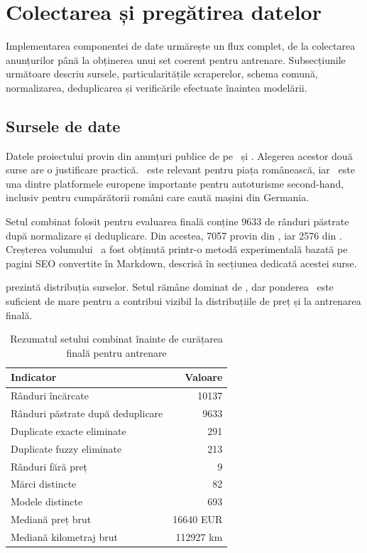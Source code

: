 \section{Colectarea și pregătirea datelor}
\label{sec:implementation-data}

Implementarea componentei de date urmărește un flux complet, de la colectarea anunțurilor până la obținerea unui set coerent pentru antrenare. Subsecțiunile următoare descriu sursele, particularitățile scraperelor, schema comună, normalizarea, deduplicarea și verificările efectuate înaintea modelării.

\subsection{Sursele de date}
\label{sec:data-sources}

Datele proiectului provin din anunțuri publice de pe \autovit\ și \mobilede. Alegerea acestor două surse are o justificare practică. \autovit\ este relevant pentru piața românească, iar \mobilede\ este una dintre platformele europene importante pentru autoturisme second-hand, inclusiv pentru cumpărătorii români care caută mașini din Germania.

Setul combinat folosit pentru evaluarea finală conține 9633 de rânduri păstrate după normalizare și deduplicare. Din acestea, 7057 provin din \autovit, iar 2576 din \mobilede. Creșterea volumului \mobilede\ a fost obținută printr-o metodă experimentală bazată pe pagini SEO convertite în Markdown, descrisă în secțiunea dedicată acestei surse.

 prezintă distribuția surselor. Setul rămâne dominat de \autovit, dar ponderea \mobilede\ este suficient de mare pentru a contribui vizibil la distribuțiile de preț și la antrenarea finală.


\begin{table}[htb]
    \centering
    \caption{Rezumatul setului combinat înainte de curățarea finală pentru antrenare}
    \label{tab:data-summary}
    \begin{tabular}{lr}
        \toprule
        Indicator & Valoare \\
        \midrule
        Rânduri încărcate & 10137 \\
        Rânduri păstrate după deduplicare & 9633 \\
        Duplicate exacte eliminate & 291 \\
        Duplicate fuzzy eliminate & 213 \\
        Rânduri fără preț & 9 \\
        Mărci distincte & 82 \\
        Modele distincte & 693 \\
        Mediană preț brut & 16640 EUR \\
        Mediană kilometraj brut & 112927 km \\
        \bottomrule
    \end{tabular}
\end{table}

